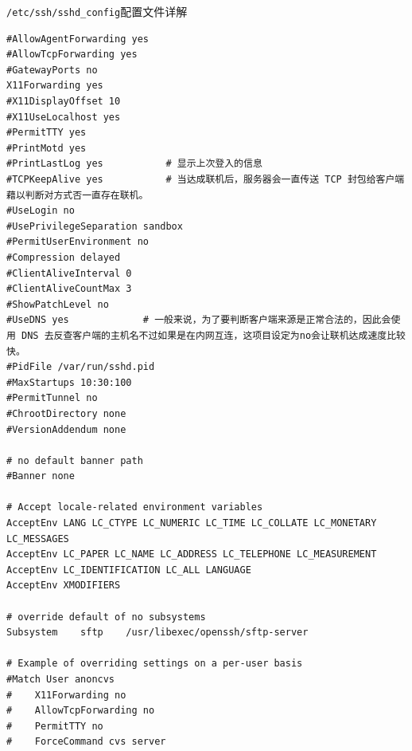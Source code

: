 \begin{ascboxB}{\texttt{/etc/ssh/sshd_config}配置文件详解}
\begin{verbatim}
#AllowAgentForwarding yes
#AllowTcpForwarding yes
#GatewayPorts no
X11Forwarding yes
#X11DisplayOffset 10
#X11UseLocalhost yes
#PermitTTY yes
#PrintMotd yes
#PrintLastLog yes           # 显示上次登入的信息
#TCPKeepAlive yes           # 当达成联机后，服务器会一直传送 TCP 封包给客户端藉以判断对方式否一直存在联机。
#UseLogin no
#UsePrivilegeSeparation sandbox
#PermitUserEnvironment no
#Compression delayed
#ClientAliveInterval 0
#ClientAliveCountMax 3
#ShowPatchLevel no
#UseDNS yes             # 一般来说，为了要判断客户端来源是正常合法的，因此会使用 DNS 去反查客户端的主机名不过如果是在内网互连，这项目设定为no会让联机达成速度比较快。
#PidFile /var/run/sshd.pid
#MaxStartups 10:30:100
#PermitTunnel no
#ChrootDirectory none
#VersionAddendum none

# no default banner path
#Banner none

# Accept locale-related environment variables
AcceptEnv LANG LC_CTYPE LC_NUMERIC LC_TIME LC_COLLATE LC_MONETARY LC_MESSAGES
AcceptEnv LC_PAPER LC_NAME LC_ADDRESS LC_TELEPHONE LC_MEASUREMENT
AcceptEnv LC_IDENTIFICATION LC_ALL LANGUAGE
AcceptEnv XMODIFIERS

# override default of no subsystems
Subsystem    sftp    /usr/libexec/openssh/sftp-server

# Example of overriding settings on a per-user basis
#Match User anoncvs
#    X11Forwarding no
#    AllowTcpForwarding no
#    PermitTTY no
#    ForceCommand cvs server
\end{verbatim}
\end{ascboxB}
\btrule{}






